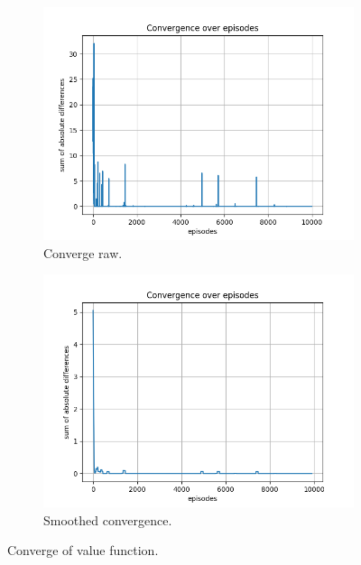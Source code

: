 \documentclass{assignment}
\begin{document}
\begin{figure}[H]
    \begin{subfigure}{0.5\textwidth}
        \includegraphics[width=\textwidth]{figures/convergence_td/gamma_sweep/convergence_TD_alpha_0.1_gamma_0.25_epislon_0.2.png}
    \caption{Converge raw.}
    \end{subfigure}\hfill
    \begin{subfigure}{0.5\textwidth}
        \includegraphics[width=\textwidth]{figures/convergence_td/gamma_sweep/convergence_TD_smoothed_alpha_0.1_gamma_0.25_epislon_0.2.png}
    \caption{Smoothed convergence.}
    \end{subfigure}
    \caption{Converge of value function.}
    \label{fig:gamma_0.25_td_learning_convergence}
\end{figure}
\end{document}
